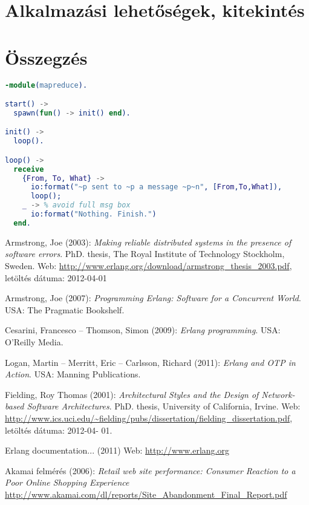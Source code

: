 \documentclass[12pt, a4paper, oneside]{book}
\begin{document}
\chapter{Alkalmazási lehetőségek, kitekintés}

\chapter{Összegzés}
\appendix

{\footnotesize

\begin{lstlisting}[emph={fun}, emphstyle=\textbf, caption=Map reduce module, language=erlang, frame=single]
-module(mapreduce).

start() ->
  spawn(fun() -> init() end).

init() ->
  loop().

loop() ->
  receive
    {From, To, What} ->
      io:format("~p sent to ~p a message ~p~n", [From,To,What]),
      loop();
    _ -> % avoid full msg box
      io:format("Nothing. Finish.")
  end.

\end{lstlisting}
}

\begin{thebibliography}{9}

Armstrong, Joe (2003): \emph{Making reliable distributed systems in the presence of software errors}. PhD.
thesis, The Royal Institute of Technology Stockholm, Sweden. Web:
\url{http://www.erlang.org/download/armstrong_thesis_2003.pdf}, letöltés dátuma: 2012-04-01

Armstrong, Joe (2007): \emph{Programming Erlang: Software for a Concurrent World}. USA: The Pragmatic
Bookshelf.

Cesarini, Francesco – Thomson, Simon (2009): \emph{Erlang programming}. USA: O'Reilly Media.

Logan, Martin – Merritt, Eric – Carlsson, Richard (2011): \emph{Erlang and OTP in Action}. USA:
Manning Publications.

Fielding, Roy Thomas (2001): \emph{Architectural Styles and the Design of Network-based Software
Architectures}. PhD. thesis, University of California, Irvine. Web:
\url{http://www.ics.uci.edu/~fielding/pubs/dissertation/fielding_dissertation.pdf}, letöltés dátuma: 2012-04-
01.

Erlang documentation... (2011) Web: \url{http://www.erlang.org}

Akamai felmérés (2006): \emph{Retail web site performance: Consumer Reaction to a Poor Online
Shopping Experience}
\url{http://www.akamai.com/dl/reports/Site_Abandonment_Final_Report.pdf}

\end{thebibliography}

\clearpage
{}
\printindex
\end{document}
